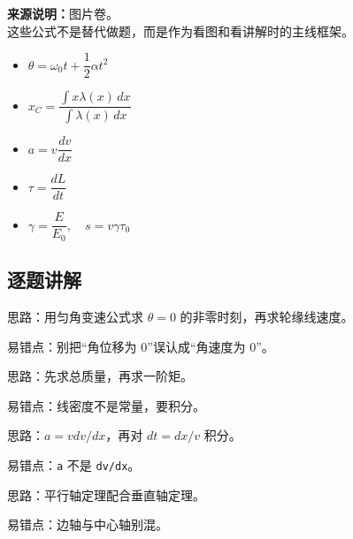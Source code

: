 \documentclass[12pt,a4paper]{ctexart}
\begin{document}
\begin{tcolorbox}[title=本卷讲解会反复用到的公式,colback=blue!3!white,colframe=blue!45!black]
\textbf{来源说明：}图片卷。\\
这些公式不是替代做题，而是作为看图和看讲解时的主线框架。
\begin{itemize}
\item $\theta=\omega_0 t+\dfrac12\alpha t^2$
\item $x_C=\dfrac{\int x\lambda(x)\,dx}{\int \lambda(x)\,dx}$
\item $a=v\dfrac{dv}{dx}$
\item $\tau=\dfrac{dL}{dt}$
\item $\gamma=\dfrac{E}{E_0},\quad s=v\gamma\tau_0$
\end{itemize}
\end{tcolorbox}


\subsection*{逐题讲解}

\begin{tcolorbox}[colback=white,colframe=black!55,title={一-1. 半径 \texttt{1.5 m} 的飞轮，初角速度 \texttt{10 rad/s}，角加速度 \(-5 rad/s^2\)，求角位移再次为 0 的时刻及线速度}]
思路：用匀角变速公式求 \(θ=0\) 的非零时刻，再求轮缘线速度。\par
易错点：别把“角位移为 0”误认成“角速度为 0”。\par
\end{tcolorbox}

\begin{tcolorbox}[colback=white,colframe=black!55,title={一-2. 线密度 \(λ=ax+b\) 的细杆，求质心坐标}]
思路：先求总质量，再求一阶矩。\par
易错点：线密度不是常量，要积分。\par
\end{tcolorbox}

\begin{tcolorbox}[colback=white,colframe=black!55,title={一-3. 质点沿 \texttt{x} 轴运动且 \(v=kx\)，求合力与从 \(x_0\) 到 \(x_1\) 的时间}]
思路：\(a=v dv/dx\)，再对 \(dt=dx/v\) 积分。\par
易错点：\texttt{a} 不是 \texttt{dv/dx}。\par
\end{tcolorbox}

\begin{tcolorbox}[colback=white,colframe=black!55,title={一-4. 矩形薄板已知边轴转动惯量，求过中心垂直板面的转动惯量}]
思路：平行轴定理配合垂直轴定理。\par
易错点：边轴与中心轴别混。\par
\end{tcolorbox}
\end{document}
